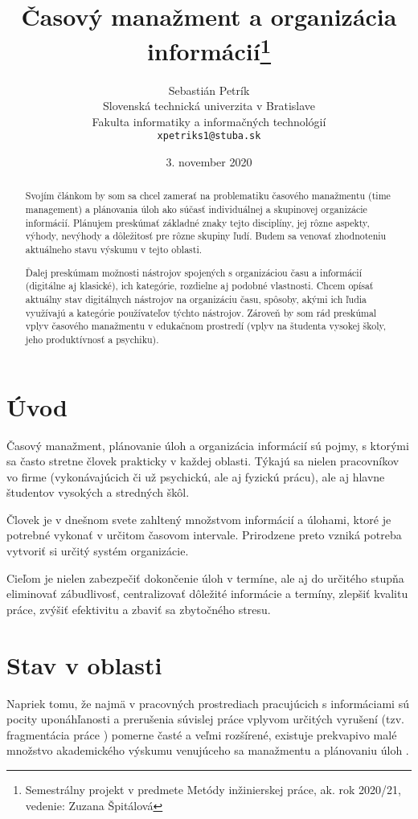 \documentclass[10pt,slovak,a4paper]{article}
\title{Časový manažment a organizácia informácií\thanks{Semestrálny projekt v predmete Metódy inžinierskej práce, ak. rok 2020/21, vedenie: Zuzana Špitálová}}
\author{Sebastián Petrík\\[2pt]
	{\small Slovenská technická univerzita v Bratislave}\\
	{\small Fakulta informatiky a informačných technológií}\\
	{\small \texttt{xpetriks1@stuba.sk}}
	}
\date{\small 3. november 2020}
\begin{document}
\maketitle

\begin{abstract}
Svojím článkom by som sa chcel zamerať na problematiku časového manažmentu (time management) a plánovania úloh ako súčasť individuálnej a skupinovej organizácie informácií. Plánujem preskúmať základné znaky tejto disciplíny, jej rôzne aspekty, výhody, nevýhody a dôležitosť pre rôzne skupiny ľudí. Budem sa venovať zhodnoteniu aktuálneho stavu výskumu v tejto oblasti.

Ďalej preskúmam možnosti nástrojov spojených s organizáciou času a informácií (digitálne aj klasické), ich kategórie, rozdielne aj podobné vlastnosti. Chcem opísať aktuálny stav digitálnych nástrojov na organizáciu času, spôsoby, akými ich ľudia využívajú a kategórie používateľov týchto nástrojov. Zároveň by som rád preskúmal vplyv časového manažmentu v edukačnom prostredí (vplyv na študenta vysokej školy, jeho produktívnosť a psychiku).

\end{abstract}
\newpage

\section{Úvod}

	Časový manažment, plánovanie úloh a organizácia informácií sú pojmy, s ktorými sa často stretne človek prakticky v každej oblasti. Týkajú sa nielen pracovníkov vo firme (vykonávajúcich či už psychickú, ale aj fyzickú prácu), ale aj hlavne študentov vysokých a stredných škôl.
	
	Človek je v dnešnom svete zahltený množstvom informácií a úlohami, ktoré je potrebné vykonať v určitom časovom intervale. Prirodzene preto vzniká potreba vytvoriť si určitý systém organizácie.
	
	Cieľom je nielen zabezpečiť dokončenie úloh v termíne, ale aj do určitého stupňa eliminovať zábudlivosť, centralizovať dôležité informácie a termíny, zlepšiť kvalitu práce, zvýšiť efektivitu a zbaviť sa zbytočného stresu.
	
\section{Stav v oblasti}
	
	Napriek tomu, že najmä v pracovných prostrediach pracujúcich s informáciami sú pocity uponáhľanosti a prerušenia súvislej práce vplyvom určitých vyrušení (tzv. fragmentácia práce \cite{NoTask}) pomerne časté a veľmi rozšírené, existuje prekvapivo malé množstvo akademického výskumu venujúceho sa manažmentu a plánovaniu úloh \cite{Franssila}. 
	
\end{document}
